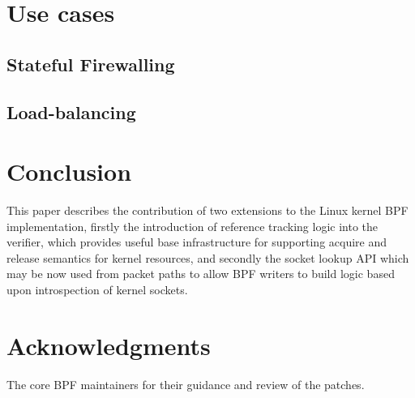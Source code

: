 \documentclass[10pt,sigconf,authorversion]{lpc}
\begin{document}
\section{Use cases}

\subsection{Stateful Firewalling}

\subsection{Load-balancing}

\section{Conclusion}

This paper describes the contribution of two extensions to the Linux kernel BPF
implementation, firstly the introduction of reference tracking logic into the
verifier, which provides useful base infrastructure for supporting acquire and
release semantics for kernel resources, and secondly the socket lookup API
which may be now used from packet paths to allow BPF writers to build logic
based upon introspection of kernel sockets.

\section{Acknowledgments}

The core BPF maintainers for their guidance and review of the patches.



\end{document}
